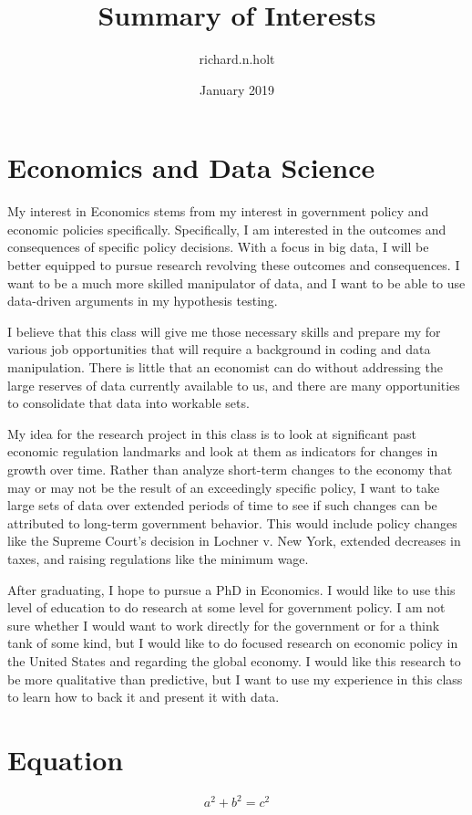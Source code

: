 \documentclass{article}
\title{Summary of Interests}
\author{richard.n.holt }
\date{January 2019}
\begin{document}
\maketitle

\section{Economics and Data Science}
My interest in Economics stems from my interest in government policy and economic policies specifically. Specifically, I am interested in the outcomes and consequences of specific policy decisions. With a focus in big data, I will be better equipped to pursue research revolving these outcomes and consequences. I want to be a much more skilled manipulator of data, and I want to be able to use data-driven arguments in my hypothesis testing.

I believe that this class will give me those necessary skills and prepare my for various job opportunities that will require a background in coding and data manipulation. There is little that an economist can do without addressing the large reserves of data currently available to us, and there are many opportunities to consolidate that data into workable sets.

My idea for the research project in this class is to look at significant past economic regulation landmarks and look at them as indicators for changes in growth over time. Rather than analyze short-term changes to the economy that may or may not be the result of an exceedingly specific policy, I want to take large sets of data over extended periods of time to see if such changes can be attributed to long-term government behavior. This would include policy changes like the Supreme Court's decision in Lochner v. New York, extended decreases in taxes, and raising regulations like the minimum wage.

After graduating, I hope to pursue a PhD in Economics. I would like to use this level of education to do research at some level for government policy. I am not sure whether I would want to work directly for the government or for a think tank of some kind, but I would like to do focused research on economic policy in the United States and regarding the global economy. I would like this research to be more qualitative than predictive, but I want to use my experience in this class to learn how to back it and present it with data.

\section{Equation}

\[a^2 + b^2 = c^2\]
\end{document}
